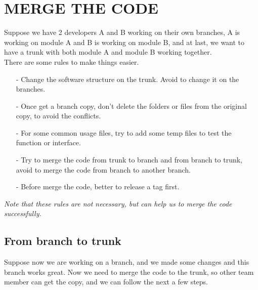 \section{MERGE THE CODE}
Suppose we have 2 developers A and B working on their own branches, A is working on module A and B is working on module B, and at last, we want to have a trunk with both module A and module B working together.\\
There are some rules to make things easier.
\begin{itemize}
\item[-] Change the software structure on the trunk. Avoid to change it on the branches.
\item[-] Once get a branch copy, don't delete the folders or files from the original copy, to avoid the conflicts.
\item[-] For some common usage files, try to add some temp files to test the function or interface.
\item[-] Try to merge the code from trunk to branch and from branch to trunk, avoid to merge the code from branch to another branch.
\item[-] Before merge the code, better to release a tag first.
\end{itemize}
\textit{Note that these rules are not necessary, but can help us to merge the code successfully.}


\subsection{From branch to trunk}
Suppose now we are working on a branch, and we made some changes and this branch works great. Now we need to merge the code to the trunk, so other team member can get the copy, and we can follow the next a few steps.

